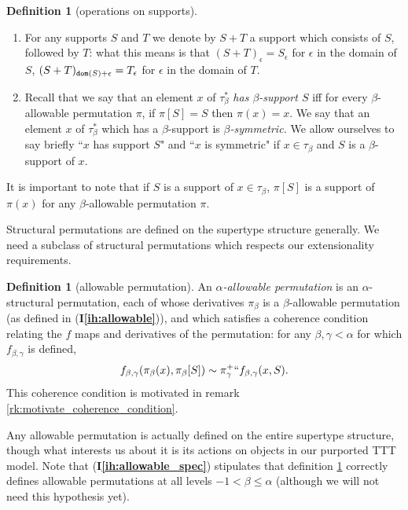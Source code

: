 \documentclass{article}
\theoremstyle{definition}
\newtheorem{definition}[theorem]{Definition}
\theoremstyle{remark}
\newcommand{\ihref}[1]{(\textbf{I\ref{#1}})}
\begin{document}
{\begin{definition}[operations on supports]
\begin{enumerate}
\item For any supports $S$ and $T$ we denote by $S+T$ a support which consists
of $S$, followed by $T$:  what this means is that $(S+T)_\epsilon = S_\epsilon$ for $\epsilon$ in the domain of $S$, $(S+T)_{{\tt dom}(S)+\epsilon} = T_\epsilon$ for $\epsilon$ in the domain of $T$.

\item
Recall that we say that an element $x$ of $\tau^*_\beta$ {\em has $\beta$-support $S$\/} iff for every $\beta$-allowable permutation $\pi$, if $\pi[S] = S$ then $\pi(x)=x$.  We say that  an element $x$ of $\tau^*_\beta$ which has a $\beta$-support is {\em $\beta$-symmetric.}  We allow ourselves to say briefly ``$x$ has support $S$" and ``$x$ is symmetric" if $x \in \tau_\beta$ and $S$ is a $\beta$-support of $x$.
\end{enumerate}
\end{definition}

It is important to note that if $S$ is a support of $x\in \tau_\beta$, $\pi[S]$ is a support of $\pi(x)$ for any $\beta$-allowable permutation $\pi$.

Structural permutations are defined on the supertype structure generally.  We need a subclass of structural permutations which respects our extensionality requirements.

\begin{definition}[allowable permutation]\label{def:allowable_permutation}
  An {\em $\alpha$-allowable permutation\/} is an $\alpha$-structural permutation, each of whose derivatives $\pi_\beta$ is a $\beta$-allowable permutation (as defined in \ihref{ih:allowable}), and which satisfies a coherence condition relating the $f$ maps and derivatives of the permutation:  for any $\beta,\gamma<\alpha$ for which $f_{\beta,\gamma}$ is defined,
  $$f_{\beta,\gamma}(\pi_\beta(x),\pi_{\beta}[S]) \sim \pi_\gamma^+``f_{\beta,\gamma}(x,S).$$
  This coherence condition is motivated in remark \ref{rk:motivate_coherence_condition}.
\end{definition}

Any allowable permutation is actually defined on the entire supertype structure, though what interests us about it is its actions on objects in our purported TTT model.
Note that \ihref{ih:allowable_spec} stipulates that definition \ref{def:allowable_permutation} correctly defines allowable permutations at all levels $-1 < \beta \leq \alpha$ (although we will not need this hypothesis yet).


}
\end{document}
